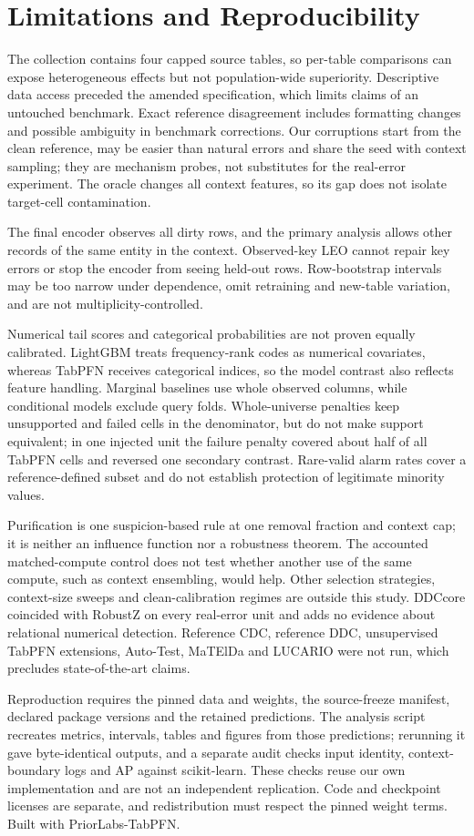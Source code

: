 \section{Limitations and Reproducibility}
The collection contains four capped source tables, so per-table comparisons can
expose heterogeneous effects but not population-wide superiority. Descriptive data
access preceded the amended specification, which limits claims of an untouched
benchmark. Exact reference disagreement includes formatting changes and possible
ambiguity in benchmark corrections. Our corruptions start from the clean reference,
may be easier than natural errors and share the seed with context sampling; they
are mechanism probes, not substitutes for the real-error experiment. The oracle
changes all context features, so its gap does not isolate target-cell contamination.

The final encoder observes all dirty rows, and the primary analysis allows other
records of the same entity in the context. Observed-key LEO cannot repair key errors
or stop the encoder from seeing held-out rows. Row-bootstrap intervals may be too
narrow under dependence, omit retraining and new-table variation, and are not
multiplicity-controlled.

Numerical tail scores and categorical probabilities are not proven equally calibrated.
LightGBM treats frequency-rank codes as numerical covariates, whereas TabPFN receives
categorical indices, so the model contrast also reflects feature handling. Marginal
baselines use whole observed columns, while conditional models exclude query folds.
Whole-universe penalties keep unsupported and failed cells in the denominator, but
do not make support equivalent; in one injected unit the failure penalty covered about
half of all TabPFN cells and reversed one secondary contrast. Rare-valid alarm rates
cover a reference-defined subset and do not establish protection of legitimate
minority values.

Purification is one suspicion-based rule at one removal fraction and context cap;
it is neither an influence function nor a robustness theorem. The accounted
matched-compute control does not test whether another use of the same compute,
such as context ensembling, would help. Other selection strategies, context-size
sweeps and clean-calibration regimes are outside this study. DDCcore coincided with
RobustZ on every real-error unit and adds no evidence about relational numerical
detection. Reference CDC, reference DDC, unsupervised TabPFN extensions, Auto-Test,
MaTElDa and LUCARIO were not run, which precludes state-of-the-art claims.

Reproduction requires the pinned data and weights, the source-freeze manifest,
declared package versions and the retained predictions. The analysis script recreates
metrics, intervals, tables and figures from those predictions; rerunning it gave
byte-identical outputs, and a separate audit checks input identity, context-boundary
logs and AP against scikit-learn. These checks reuse our own implementation and are
not an independent replication. Code and checkpoint licenses are separate, and
redistribution must respect the pinned weight terms. Built with PriorLabs-TabPFN.
